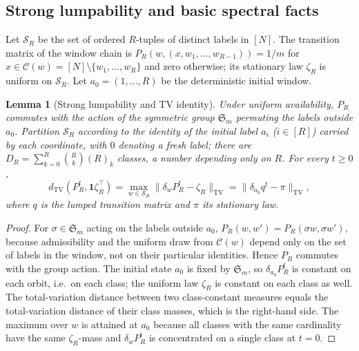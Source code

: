 \documentclass[twoside,11pt]{article}
\newtheorem{slemma}{Lemma}[subsection]
\begin{document}
\subsection{Strong lumpability and basic spectral facts}
\label{sec:S2}

Let $\mathcal S_R$ be the set of ordered $R$-tuples of distinct labels in
$[N]$. The transition matrix of the window chain is
$P_R(w,(x,w_1,\dots,w_{R-1}))=1/m$ for $x\in \mathcal{C}(w)=[N]\setminus\{w_1,\dots,w_R\}$
and zero otherwise; its stationary law $\zeta_R$ is uniform on $\mathcal S_R$.
Let $a_0=(1,\dots,R)$ be the deterministic initial window.

\begin{slemma}[Strong lumpability and TV identity]\label{lem:A}
Under uniform availability, $P_R$ commutes with the action of the symmetric
group $\mathfrak{S}_{m}$ permuting the labels outside $a_0$. Partition $\mathcal S_R$
according to the identity of the initial label $a_i$ ($i\in[R]$) carried by
each coordinate, with $0$ denoting a fresh label; there are
$D_R=\sum_{k=0}^{R}\binom{R}{k}(R)_k$ classes, a number depending only on
$R$. For every $t\ge0$,
\begin{equation}\label{eq:S2-tv}
d_{\mathrm{TV}}(P_R^{t},\mathbf 1\zeta_R^{\top})
=\max_{w\in\mathcal S_R}\|\delta_wP_R^{t}-\zeta_R\|_{\mathrm{TV}}
=\|\delta_{a_0}q^{t}-\pi\|_{\mathrm{TV}},
\end{equation}
where $q$ is the lumped transition matrix and $\pi$ its stationary law.
\end{slemma}

\begin{proof}
For $\sigma\in \mathfrak{S}_m$ acting on the labels outside $a_0$, $P_R(w,w')=P_R(\sigma w,\sigma w')$,
because admissibility and the uniform draw from $\mathcal{C}(w)$ depend only on the set
of labels in the window, not on their particular identities. Hence $P_R$ commutes
with the group action. The initial state $a_0$ is fixed by $\mathfrak{S}_m$, so
$\delta_{a_0}P_R^{t}$ is constant on each orbit, i.e.\ on each class; the
uniform law $\zeta_R$ is constant on each class as well. The total-variation
distance between two class-constant measures equals the total-variation
distance of their class masses, which is the right-hand side. The maximum over
$w$ is attained at $a_0$ because all classes with the same cardinality have
the same $\zeta_R$-mass and $\delta_wP_R^{t}$ is concentrated on a single
class at $t=0$.
\end{proof}
\end{document}
